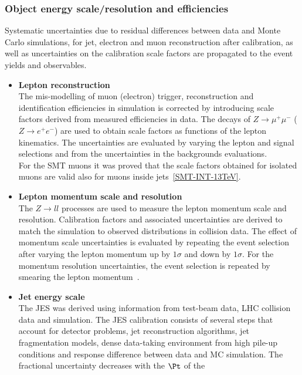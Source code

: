\subsubsection{Object energy scale/resolution and efficiencies} 
Systematic uncertainties due to residual differences between data and
Monte Carlo simulations, for jet, electron and muon reconstruction
after calibration, as well as uncertainties on the calibration scale
factors are propagated to the event yields and observables.

\begin{itemize}
	\item \textbf{Lepton reconstruction} \\ 
	The mis-modelling of muon (electron) trigger, reconstruction and
	identification efficiencies in simulation is corrected by introducing
	scale factors derived from measured efficiencies in data. The decays
	of $Z \to \mu^+ \mu^-$ ($Z \to e^+ e^-$) are used to obtain scale
	factors as functions of the lepton kinematics. The uncertainties are
	evaluated by varying the lepton and signal selections and from the
	uncertainties in the backgrounds evaluations. \\
	For the SMT muons it was proved that the scale factors obtained for
	isolated muons are valid also for muons inside jets~\ref{SMT-INT-13TeV}. 
	\item \textbf{Lepton momentum scale and resolution} \\ 
	The $Z \to ll$ processes are used to measure the lepton momentum scale
	and resolution. Calibration factors and associated uncertainties are
	derived to match the simulation to observed distributions in collision
	data. The effect of momentum scale uncertainties is evaluated by
	repeating the event selection after varying the lepton momentum up by
	$1\sigma$ and down by $1\sigma$. For the momentum resolution
	uncertainties, the event selection is repeated by smearing the lepton
	momentum~\cite{PERF-2013-05}.
	\item \textbf{Jet energy scale} \\ 
	The JES was derived using information from test-beam data, LHC
	collision data and simulation. The JES calibration consists of several
	steps that account for detector problems, jet reconstruction
	algorithms, jet fragmentation models, dense data-taking environment
	from high pile-up conditions and response difference between data and
	MC simulation. 
	The fractional uncertainty decreases with the $\Pt$ of the

\end{itemize}
